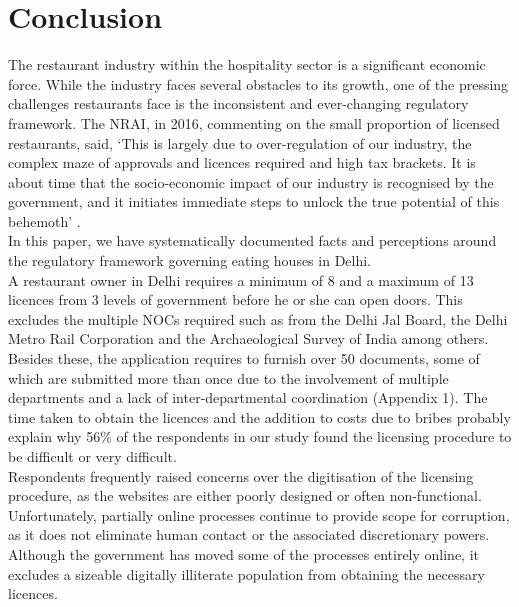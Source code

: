 \documentclass[a4paper, 12pt, twoside]{article}
\begin{document}

		\section*{Conclusion}
		\label{end}
		
		The restaurant industry within the hospitality sector is a significant economic force. While the industry faces several obstacles to its growth, one of the pressing challenges restaurants face is the inconsistent and ever-changing regulatory framework. The 
NRAI, in 2016, commenting on the small proportion of licensed restaurants, said, ‘This is largely due to over-regulation of our industry, the complex maze of approvals and licences required and high tax brackets. It is about time that the socio-economic impact of 
our industry is recognised by the government, and it initiates immediate steps to unlock the true potential of this behemoth’ \parencite{nrai1}.\\
		
		In this paper, we have systematically documented facts and perceptions around the regulatory framework governing eating houses in Delhi. \\
		
		A restaurant owner in Delhi requires a minimum of 8 and a maximum of 13 licences from 3 levels of government before he or she can open doors. This excludes the multiple NOCs required such as from the Delhi Jal Board, the Delhi Metro Rail 
Corporation and the Archaeological Survey of India among others. Besides these, the application requires to furnish over 50 documents, some of which are submitted more than once due to the involvement of multiple departments and a lack of inter-departmental 
coordination (Appendix 1). The time taken to obtain the licences and the addition to costs due to bribes probably explain why 56\% of the respondents in our study found the licensing procedure to be difficult or very difficult.\\ 
		
		Respondents frequently raised concerns over the digitisation of the licensing procedure, as the websites are either poorly designed or often non-functional. Unfortunately, partially online processes continue to provide scope for corruption, as it does not 
eliminate human contact or the associated discretionary powers. Although the government has moved some of the processes entirely online, it excludes a sizeable digitally illiterate population from obtaining the necessary licences.\\
		
\end{document}
